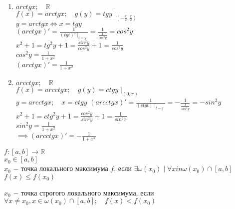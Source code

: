 \begin{properties}
\begin{enumerate}
            \item $arctgx; \quad  \mathbb{R}$\\
                $f(x)=arctgx; \quad g(y)=tgy\mid_{(-\displaystyle\frac{\pi}{2},\displaystyle\frac{\pi}{2})}$ \\
                $y=arctgx \iff x=tgy$\\
                $(arctgx)'=\displaystyle\frac{1}{(tgt)'\mid_{t=y}}=\displaystyle\frac{1}{\displaystyle\frac{1}{cos^2y}}=cos^2y$ \\
                $x^2+1=tg^2y+1=\displaystyle\frac{sin^2y}{cos^2y}+1=\displaystyle\frac{1}{cos^2y}$ \\
                $cos^2y=\displaystyle\frac{1}{1+x^2}$\\
                $(arctgx)'=\displaystyle\frac{1}{1+x^2}$
            \item $arcctgx; \quad  \mathbb{R}$\\
                $f(x)=arcctgx; \quad g(y)=ctgy\mid_{(0,\pi)}$ \\
                $y=arcctgx; \quad x=ctgy$
                $(arcctgx)'=\displaystyle\frac{1}{(ctgt)\mid_{t=y}}=-\displaystyle\frac{1}{\displaystyle\frac{1}{sin^2y}}=-sin^2y$ \\
                $x^2+1=ctg^2y+1=\displaystyle\frac{cos^2y}{sin^2y}+1=\displaystyle\frac{1}{sin^2x}$ \\
                $sin^2y=\displaystyle\frac{1}{1+x^2}$ \\
                $\implies (arcctgx)'=-\displaystyle\frac{1}{1+x^2}$
    \end{enumerate}
    \end{properties}
    \begin{definition}
        $f: [a,b] \to \mathbb{R}$ \\
        $x_0 \in [a,b]$ \\
        $x_0$ $-$ точка локального максимума $f$, если $\exists \omega(x_0)\mid \forall x in \omega(x_0)\cap [a,b]$ \\
        $f(x) \le f(x_0)$\\
    \end{definition}
    \begin{definition}
        $x_0$ $-$ точка строгого локального максимума, если $\forall x \neq x_0, x \in \omega(x_0) \cap [a,b]; \quad f(x) < f(x_0)$
    \end{definition}
    

